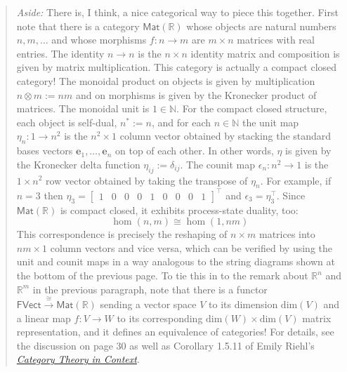 \documentclass{tufte-handout-tai}
\theoremstyle{plain}
\theoremstyle{definition}
\theoremstyle{remark}
\begin{document}
	\begin{quote}
	\textit{Aside:} There is, I think, a nice categorical way to piece this together. First note that there is a category $\mathsf{Mat}(\mathbb{R})$ whose objects are natural numbers $n,m,\ldots$ and whose morphisms $f\colon n \to m$ are $m\times n$ matrices with real entries. The identity $n\to n$ is the $n\times n$ identity matrix and composition is given by matrix multiplication. This category is actually a compact closed category! The monoidal product on objects is given by multiplication $n\otimes m:=nm$ and on morphisms is given by the Kronecker product of matrices. The monoidal unit is $1\in \mathbb{N}$. For the compact closed structure, each object is self-dual, $n^*:=n$, and for each $n\in\mathbb{N}$ the unit map $\eta_n\colon 1\to n^2$ is the $n^2\times 1$ column vector obtained by stacking the standard bases vectors $\mathbf{e}_1,\ldots,\mathbf{e}_n$ on top of each other. In other words, $\eta$ is given by the Kronecker delta function $\eta_{ij}:=\delta_{ij}$. The counit map $\epsilon_n\colon n^2\to 1$ is the $1\times n^2$ row vector obtained by taking the transpose of $\eta_n$. For example, if $n=3$ then $\eta_3=\begin{bmatrix}1&0&0&0&1&0&0&0&1\end{bmatrix}^\top$
	 and $\epsilon_3=\eta_3^\top.$ Since $\mathsf{Mat}(\mathbb{R})$ is compact closed, it exhibits process-state duality, too:
	\[\hom(n,m)\cong \hom(1,nm)\]
	This correspondence is precisely the reshaping of $n\times m$ matrices into $nm\times 1$ column vectors and vice versa, which can be verified by using the unit and counit maps in a way analogous to the string diagrams shown at the bottom of the previous page. To tie this in to the remark about $\mathbb{R}^n$ and $\mathbb{R}^m$ in the previous paragraph, note that there is a functor $\mathsf{FVect}\overset{\cong}{\to}\mathsf{Mat}(\mathbb{R})$ sending a vector space $V$ to its dimension $\text{dim}(V)$ and a linear map $f\colon V\to W$ to its corresponding $\text{dim}(W)\times \text{dim}(V)$ matrix representation, and it defines an equivalence of categories! For details, see the discussion on page 30 as well as Corollary 1.5.11 of Emily Riehl's \href{http://www.math.jhu.edu/~eriehl/context.pdf}{\textit{Category Theory in Context}}. 
	\end{quote}
\end{document}

